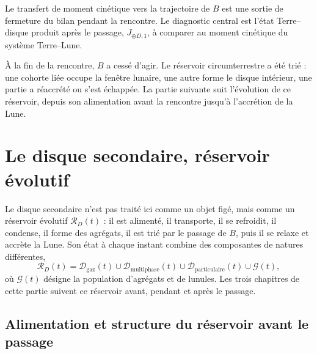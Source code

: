 \documentclass[11pt,a4paper,openany]{report}
\newcommand{\RD}{\mathcal{R}_{D}}
\begin{document}
\begin{controle}
Le transfert de moment cinétique vers la trajectoire de $B$ est une sortie de fermeture du bilan
pendant la rencontre. Le diagnostic central est l'état Terre--disque produit après le passage,
$J_{\oplus D,1}$, à comparer au moment cinétique du système Terre--Lune.
\end{controle}


\begin{rappel}
À la fin de la rencontre, $B$ a cessé d'agir. Le réservoir circumterrestre a été trié : une cohorte liée
occupe la fenêtre lunaire, une autre forme le disque intérieur, une partie a réaccrété ou s'est
échappée. La partie suivante suit l'évolution de ce réservoir, depuis son alimentation avant la
rencontre jusqu'à l'accrétion de la Lune.
\end{rappel}

\part{Le disque secondaire, réservoir évolutif}
\label{part:reservoir}

\noindent
Le disque secondaire n'est pas traité ici comme un objet figé, mais comme un réservoir
évolutif $\RD(t)$ : il est alimenté, il transporte, il se refroidit, il condense, il forme des agrégats,
il est trié par le passage de $B$, puis il se relaxe et accrète la Lune. Son état à chaque instant
combine des composantes de natures différentes,
\begin{equation}
\RD(t)=\mathcal{D}_{\mathrm{gaz}}(t)\cup\mathcal{D}_{\mathrm{multiphase}}(t)\cup
\mathcal{D}_{\mathrm{particulaire}}(t)\cup\mathcal{G}(t),
\label{eq:RD}
\end{equation}
où $\mathcal{G}(t)$ désigne la population d'agrégats et de lunules. Les trois chapitres de cette
partie suivent ce réservoir avant, pendant et après le passage.

\chapter{Alimentation et structure du réservoir avant le passage}
\label{ch:structure}
\end{document}
